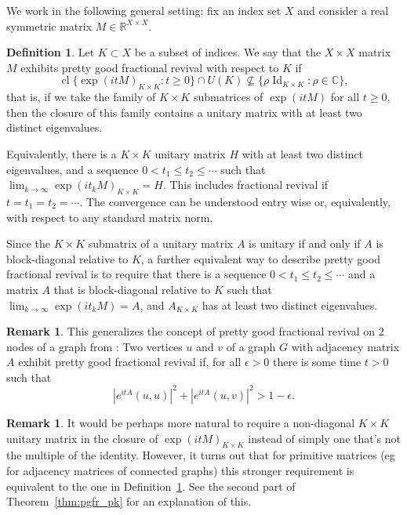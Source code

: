\documentclass[11pt]{article}
\theoremstyle{definition}
\newtheorem{defi}[theo]{Definition}
\newtheorem{rema}[theo]{Remark}
\numberwithin{equation}{section}
\newcommand\+{\mkern2mu}
\newcommand{\R}{\mathbb{R}}
\newcommand{\C}{\mathbb{C}}
\newcommand{\1}{\mathbf 1}
\DeclareMathOperator{\Id}{Id}
\DeclareMathOperator{\cl}{cl}
\begin{document}
We work in the following general setting: fix an index set $X$ and consider a real symmetric matrix $M \in \R^{X\times X}$. 

\begin{defi}\label{def:pgfr}
Let $K \subset X$ be a subset of indices. We say that the $X \times X$ matrix $M$ exhibits pretty good fractional revival with respect to $K$ if 
\[ \cl \{ \exp(i t M)_{K \times K} : t \geq 0\} \cap U(K) \nsubseteq \{ \rho \Id_{K \times K} : \rho \in \C\}, \]
that is, if we take the family of  $K\times K$ submatrices of $\exp(i t M)$ for all $t \geq 0$, then the closure of this family contains a unitary matrix with at least two distinct eigenvalues.

Equivalently, there is a $K \times K$ unitary matrix $H$ with at least two distinct eigenvalues, and a sequence $0 < t_1 \leq t_2 \leq  \cdots$ such that $\lim_{k \to \infty} \exp(i t_k M)_{K \times K} = H$. This includes fractional revival if $t = t_1 = t_2 = \cdots$. The convergence can be understood entry wise or, equivalently, with respect to any standard matrix norm.

Since the $K \times K$ submatrix of a unitary matrix $A$ is unitary if and only if $A$ is block-diagonal relative to $K$, a further equivalent way to describe pretty good fractional revival is to require that there is a sequence $0 < t_1 \leq t_2 \leq \cdots$ and a matrix $A$ that is block-diagonal relative to $K$ such that $\lim_{k\to \infty} \exp(it_k M) = A$, and $A_{K\times K}$ has at least two distinct eigenvalues.

\end{defi}

\begin{rema}
This generalizes the concept of pretty good fractional revival on 2 nodes of a graph from \cite{chan2020approximate}:
Two vertices $u$ and $v$ of a graph $G$ with adjacency matrix $A$ exhibit pretty good fractional revival if, for all $\epsilon>0$ there is some time $t>0$ such that
\[
|e^{itA}(u,u)|^2+|e^{itA}(u,v)|^2 > 1-\epsilon.
\]
\end{rema}

\begin{rema}
It would be perhaps more natural to require a non-diagonal $K \times K$ unitary matrix in the closure of $\exp(it M)_{K \times K}$ instead of simply one that's not the multiple of the identity. However, it turns out that for primitive matrices (eg for adjacency matrices of connected graphs) this stronger requirement is equivalent to the one in Definition~\ref{def:pgfr}. See the second part of Theorem~\ref{thm:pgfr_pk} for an explanation of this.
\end{rema}
\end{document}
